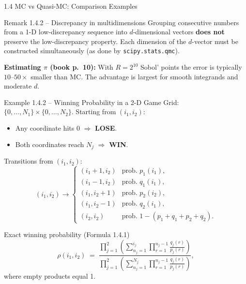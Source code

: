 \documentclass[aspectratio=169,10pt]{beamer}
\begin{document}
\begin{frame}[allowframebreaks]{1.4 MC vs Quasi-MC: Comparison Examples}

  \begin{block}{Remark 1.4.2 -- Discrepancy in multidimensions}
    Grouping consecutive numbers from a 1-D low-discrepancy sequence
    into $d$-dimensional vectors \textbf{does not} preserve the
    low-discrepancy property.  Each dimension of the $d$-vector must be
    constructed simultaneously (as done by \texttt{scipy.stats.qmc}).
  \end{block}

  \textbf{Estimating $\pi$ (book p.~10):}
  With $R = 2^{10}$ Sobol' points the error is typically
  $10\text{--}50\times$ smaller than MC. The advantage is largest for
  smooth integrands and moderate $d$.

  \framebreak

  \begin{block}{Example 1.4.2 -- Winning Probability in a 2-D Game}
    \small
    Grid: $\{0,\ldots,N_1\}\times\{0,\ldots,N_2\}$. Starting from
    $(i_1,i_2)$:
    \begin{itemize}
      \item Any coordinate hits $0$ $\Rightarrow$ \textbf{LOSE}.
      \item Both coordinates reach $N_j$ $\Rightarrow$ \textbf{WIN}.
    \end{itemize}
    Transitions from $(i_1,i_2)$:
    \[
      (i_1,i_2)\to
      \begin{cases}
        (i_1+1,i_2) & \text{prob. } p_1(i_1),\\
        (i_1-1,i_2) & \text{prob. } q_1(i_1),\\
        (i_1,i_2+1) & \text{prob. } p_2(i_2),\\
        (i_1,i_2-1) & \text{prob. } q_2(i_1),\\
        (i_2,i_2)   & \text{prob. } 1-(p_1+q_1+p_2+q_2).
      \end{cases}
    \]
  \end{block}

  \framebreak

  \begin{block}{Exact winning probability (Formula 1.4.1)}
    \[
      \rho(i_1, i_2) \;=\;
      \frac{\displaystyle
        \prod_{j=1}^{2}\!\left(
          \sum_{n_j=1}^{i_j}\prod_{r=1}^{n_j-1}
          \tfrac{q_j(r)}{p_j(r)}
        \right)}
      {\displaystyle
        \prod_{j=1}^{2}\!\left(
          \sum_{n_j=1}^{N_j}\prod_{r=1}^{n_j-1}
          \tfrac{q_j(r)}{p_j(r)}
        \right)},
    \]
    where empty products equal 1.
  \end{block}


\end{frame}
\end{document}

